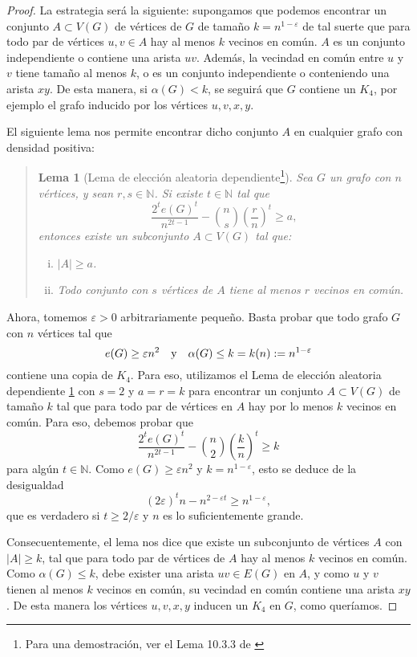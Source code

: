 \documentclass[12pt]{report}
\theoremstyle{plain}
\newtheorem{lemma}[theorem]{Lema}
\theoremstyle{definition}
\newcommand{\naturals}{\mathbb{N}}
\newcommand{\abs}[1]{\left \vert #1 \right \vert}
\begin{document}
\begin{proof}
La estrategia será la siguiente: supongamos que podemos encontrar un conjunto $A \subset V(G)$ de vértices de $G$ de tamaño $k = n^{1- \varepsilon}$ de tal suerte que para todo par de vértices $u,v \in A$ hay al menos $k$ vecinos en común. $A$ es un conjunto independiente o contiene una arista $uv$. Además, la vecindad en común entre $u$ y $v$ tiene tamaño al menos $k$, o es un conjunto independiente o conteniendo una arista $xy$. De esta manera, si $\alpha (G) < k$, se seguirá que $G$ contiene un $K_4$, por ejemplo el grafo inducido por los vértices $u,v,x,y$.

El siguiente lema nos permite encontrar dicho conjunto $A$ en cualquier grafo con densidad positiva:
\vspace{-20pt}
\begin{quote}
\begin{lemma}[Lema de elección aleatoria dependiente\footnote{
Para una demostración, ver el Lema 10.3.3 de \cite{botler2022combinatoria}
}]\label{lema:eleccion aleatoria dependiente}
Sea $G$ un grafo con $n$ vértices, y sean $r,s \in \naturals$. Si existe $t \in \naturals$ tal que
\[
    \frac{2^t e(G)^t}{n^{2t - 1}} - \binom n s \left ( \frac r n \right )^t \geq a,
\]
entonces existe un subconjunto $A \subset V(G)$ tal que:
\begin{enumerate}[(i)]
\item $\abs A \geq a$.
\item Todo conjunto con $s$ vértices de $A$ tiene al menos $r$ vecinos en común.
\end{enumerate}
\end{lemma}
\end{quote}

Ahora, tomemos $\varepsilon > 0$ arbitrariamente pequeño. Basta probar que todo grafo $G$ con $n$ vértices tal que
\[
    e(G) \geq \varepsilon n^2 \quad \text y \quad \alpha (G) \leq k = k(n) := n^{1- \varepsilon}
\]
contiene una copia de $K_4$. Para eso, utilizamos el Lema de elección aleatoria dependiente \ref{lema:eleccion aleatoria dependiente} con $s = 2$ y $a = r = k$ para encontrar un conjunto $A \subset V(G)$ de tamaño $k$ tal que para todo par de vértices en $A$ hay por lo menos $k$ vecinos en común. Para eso, debemos probar que
\[
    \frac{2^t e(G)^t}{n^{2t-1}} - \binom n 2 \left ( \frac k n \right )^t \geq k
\]
para algún $t \in \naturals$. Como $e(G) \geq \varepsilon n^2$ y $k = n^{1-\varepsilon}$, esto se deduce de la desigualdad
\[
    (2\varepsilon)^t n - n^{2 - \varepsilon t} \geq n^{1-\varepsilon},
\]
que es verdadero si $t \geq 2 / \varepsilon$ y $n$ es lo suficientemente grande.

Consecuentemente, el lema nos dice que existe un subconjunto de vértices $A$ con $\abs A \geq k$, tal que para todo par de vértices de $A$ hay al menos $k$ vecinos en común. Como $\alpha (G) \leq k$, debe exister una arista $uv \in E(G)$ en $A$, y como $u$ y $v$ tienen al menos $k$ vecinos en común, su vecindad en común contiene una arista $xy$. De esta manera los vértices $u,v,x,y$ inducen un $K_4$ en $G$, como queríamos.
\end{proof}
\end{document}
